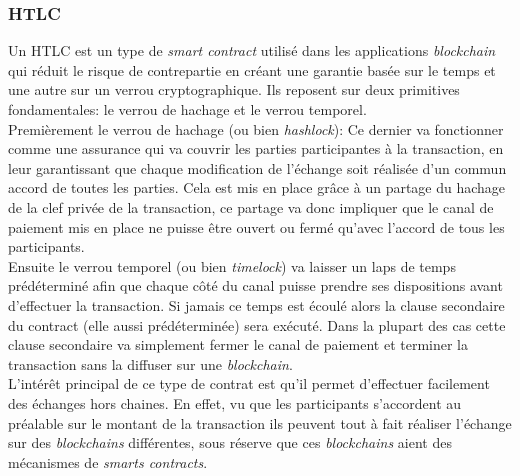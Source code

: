 \subsubsection{HTLC}

Un HTLC est un type de \textit{smart contract} utilisé dans les applications \textit{blockchain} qui réduit le risque de contrepartie en créant une garantie basée sur le temps et une autre sur un verrou cryptographique.
Ils reposent sur deux primitives fondamentales: le verrou de hachage et le verrou temporel.\\
Premièrement le verrou de hachage (ou bien \textit{hashlock}): Ce dernier va fonctionner comme une assurance qui va couvrir les parties participantes à la transaction, en leur garantissant que chaque modification de l'échange soit réalisée d'un commun accord de toutes les parties.
Cela est mis en place grâce à un partage du hachage de la clef privée de la transaction, ce partage va donc impliquer que le canal de paiement mis en place ne puisse être ouvert ou fermé qu'avec l'accord de tous les participants.\\
Ensuite le verrou temporel (ou bien \textit{timelock}) va laisser un laps de temps prédéterminé afin que chaque côté du canal puisse prendre ses dispositions avant d'effectuer la transaction. Si jamais ce temps est écoulé alors la clause secondaire du contract (elle aussi prédéterminée) sera exécuté. 
Dans la plupart des cas cette clause secondaire va simplement fermer le canal de paiement et terminer la transaction sans la diffuser sur une \textit{blockchain}.\\
L’intérêt principal de ce type de contrat est qu'il permet d'effectuer facilement des échanges hors chaines. En effet, vu que les participants s'accordent au préalable sur le montant de la transaction ils peuvent tout à fait réaliser l'échange sur des \textit{blockchains} différentes, sous réserve que ces \textit{blockchains} aient des mécanismes de \textit{smarts contracts}.

